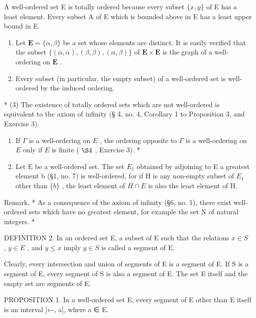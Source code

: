 A well-ordered set E is totally ordered because every subset \(\{x, y\}\) of E has a least element. Every subset A of E which is bounded above in E has a least upper bound in E.


\begin{enumerate}
\def\labelenumi{(\arabic{enumi})}
\item
  Let \(\mathbf{E} = \{\alpha, \beta\}\) be a set whose elements are distinct. It is easily verified that the subset \(\{(\alpha, \alpha), (\beta, \beta), (\alpha, \beta)\}\) of \(\mathbf{E} \times \mathbf{E}\) is the graph of a well-ordering on \(\mathbf{E}\) .
\item
  Every subset (in particular, the empty subset) of a well-ordered set is well-ordered by the induced ordering.
\end{enumerate}

* (3) The existence of totally ordered sets which are not well-ordered is equivalent to the axiom of infinity (§ 4, no. 4, Corollary 1 to Proposition 3, and Exercise 3).

\begin{enumerate}
\def\labelenumi{(\arabic{enumi})}
\setcounter{enumi}{3}
\item
  If \(\Gamma\) is a well-ordering on \(E\) , the ordering opposite to \(\Gamma\) is a well-ordering on \(E\) only if \(E\) is finite ( \(\S 4\) , Exercise 3). *
\item
  Let E be a well-ordered set. The set \(E_{1}\) obtained by adjoining to E a greatest element b (§1, no. 7) is well-ordered, for if H is any non-empty subset of \(E_{1}\) other than \(\{b\}\) , the least element of \(H \cap E\) is also the least element of H.
\end{enumerate}

Remark. * As a consequence of the axiom of infinity (§6, no. 1), there exist well-ordered sets which have no greatest element, for example the set N of natural integers. *

DEFINITION 2. In an ordered set E, a subset of E such that the relations \(x \in S\) , \(y \in E\) , and \(y \leqslant x\) imply \(y \in S\) is called a segment of E.

Clearly, every intersection and union of segments of E is a segment of E. If S is a segment of E, every segment of S is also a segment of E. The set E itself and the empty set are segments of E.

PROPOSITION 1. In a well-ordered set E, every segment of E other than E itself is an interval {]}←, a{[}, where a ∈ E.

